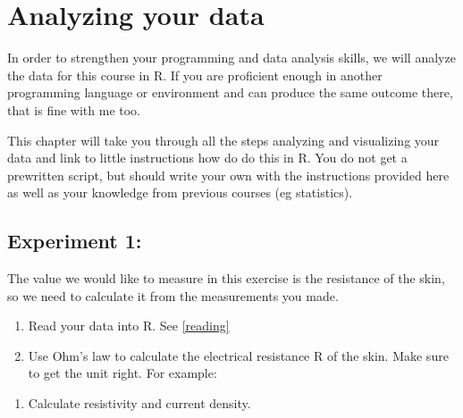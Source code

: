 \documentclass[
]{book}
\newenvironment{Shaded}{\begin{snugshade}}{\end{snugshade}}
\newcommand{\DecValTok}[1]{\textcolor[rgb]{0.00,0.00,0.81}{#1}}
\newcommand{\FloatTok}[1]{\textcolor[rgb]{0.00,0.00,0.81}{#1}}
\newcommand{\NormalTok}[1]{#1}
\newcommand{\OtherTok}[1]{\textcolor[rgb]{0.56,0.35,0.01}{#1}}
\newcommand{\SpecialCharTok}[1]{\textcolor[rgb]{0.81,0.36,0.00}{\textbf{#1}}}
\providecommand{\tightlist}{%
  \setlength{\itemsep}{0pt}\setlength{\parskip}{0pt}}
\begin{document}
\chapter{Analyzing your data}\label{analyzing-your-data}

In order to strengthen your programming and data analysis skills, we will analyze the data for this course in R. If you are proficient enough in another programming language or environment and can produce the same outcome there, that is fine with me too.

This chapter will take you through all the steps analyzing and visualizing your data and link to little instructions how do do this in R. You do not get a prewritten script, but should write your own with the instructions provided here as well as your knowledge from previous courses (eg statistics).

\section{Experiment 1:}\label{experiment-1}

The value we would like to measure in this exercise is the resistance of the skin, so we need to calculate it from the measurements you made.

\begin{enumerate}
\def\labelenumi{\arabic{enumi}.}
\item
  Read your data into R. See \ref{reading}
\item
  Use Ohm's law to calculate the electrical resistance R of the skin. Make sure to get the unit right. For example:
\end{enumerate}

\begin{Shaded}
\end{Shaded}

\begin{enumerate}
\def\labelenumi{\arabic{enumi}.}
\setcounter{enumi}{2}
\tightlist
\item
  Calculate resistivity and current density.
\end{enumerate}

\begin{Shaded}
\end{Shaded}
\end{document}

